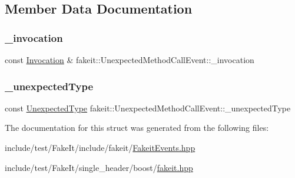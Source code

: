 \subsection{Member Data Documentation}
\mbox{\label{structfakeit_1_1UnexpectedMethodCallEvent_a57e9ca7a92fac715dda5922f2d7ad8b2}} 
\subsubsection{\texorpdfstring{\_invocation}{\_invocation}}
{\footnotesize\ttfamily const \mbox{\hyperlink{structfakeit_1_1Invocation}{Invocation}} \& fakeit\+::\+Unexpected\+Method\+Call\+Event\+::\+\_\+invocation}

\mbox{\label{structfakeit_1_1UnexpectedMethodCallEvent_a0697dbe423c830ebbb177ccdef02606c}} 
\subsubsection{\texorpdfstring{\_unexpectedType}{\_unexpectedType}}
{\footnotesize\ttfamily const \mbox{\hyperlink{namespacefakeit_ae284671dc00c0fa5ee2aa4a6af02743b}{Unexpected\+Type}} fakeit\+::\+Unexpected\+Method\+Call\+Event\+::\+\_\+unexpected\+Type}



The documentation for this struct was generated from the following files\+:\begin{DoxyCompactItemize}
\item 
include/test/\+Fake\+It/include/fakeit/\mbox{\hyperlink{FakeitEvents_8hpp}{Fakeit\+Events.\+hpp}}\item 
include/test/\+Fake\+It/single\+\_\+header/boost/\mbox{\hyperlink{single__header_2boost_2fakeit_8hpp}{fakeit.\+hpp}}\end{DoxyCompactItemize}
